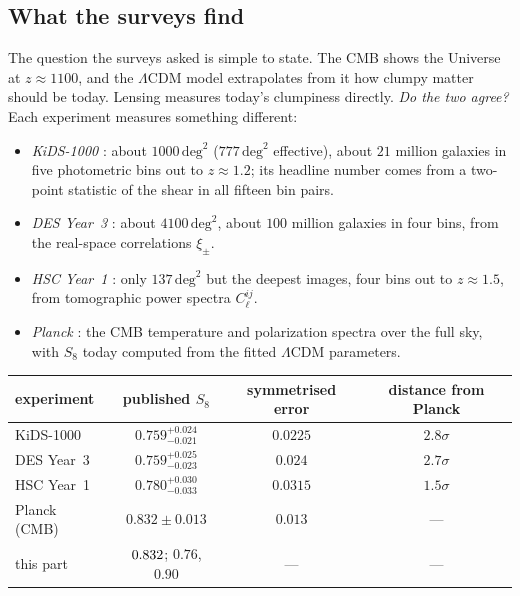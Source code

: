 \subsection{What the surveys find}
\label{T1b:sec:s8-surveys}

The question the surveys asked is simple to state. The CMB shows the Universe at $z\approx1100$, and the $\Lambda$CDM model extrapolates from it how clumpy matter should be today. Lensing measures today's clumpiness directly. \emph{Do the two agree?} Each experiment measures something different:
\begin{itemize}[leftmargin=1.2em,itemsep=1pt]
\item \emph{KiDS-1000} \cite{Asgari2021KiDS}: about $1000\,\mathrm{deg}^2$ ($777\,\mathrm{deg}^2$ effective), about $21$ million galaxies in five photometric bins out to $z\approx1.2$; its headline number comes from a two-point statistic of the shear in all fifteen bin pairs.
\item \emph{DES Year~3} \cite{Amon2022DES}: about $4100\,\mathrm{deg}^2$, about $100$ million galaxies in four bins, from the real-space correlations $\xi_\pm$.
\item \emph{HSC Year~1} \cite{Hikage2019HSC}: only $137\,\mathrm{deg}^2$ but the deepest images, four bins out to $z\approx1.5$, from tomographic power spectra $C_\ell^{ij}$.
\item \emph{Planck} \cite{Planck2018VI}: the CMB temperature and polarization spectra over the full sky, with $S_8$ today computed from the fitted $\Lambda$CDM parameters.
\end{itemize}

\begin{center}
\small
\begin{tabular}{@{}lccc@{}}
\toprule
experiment & published $S_8$ & symmetrised error & distance from Planck\\\midrule
KiDS-1000 & $0.759^{+0.024}_{-0.021}$ & $0.0225$ & $2.8\sigma$\\
DES Year~3 & $0.759^{+0.025}_{-0.023}$ & $0.024$ & $2.7\sigma$\\
HSC Year~1 & $0.780^{+0.030}_{-0.033}$ & $0.0315$ & $1.5\sigma$\\
Planck (CMB) & $0.832\pm0.013$ & $0.013$ & ---\\
this part & $0.832$; $0.76$, $0.90$ & --- & ---\\
\bottomrule
\end{tabular}
\end{center}

